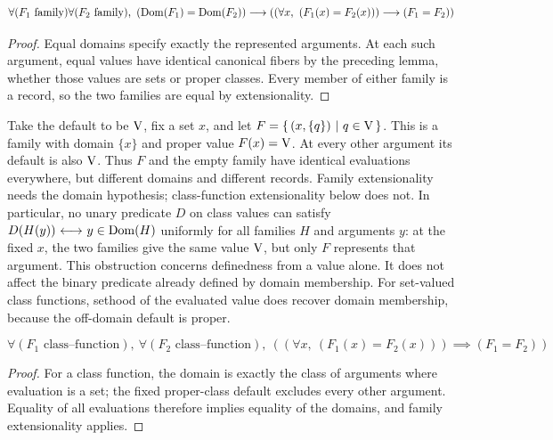 \begin{theorem}
\[
\forall (F_1 \text{ family})
\forall (F_2 \text{ family}),\ %
(\Dom(F_1)=\Dom(F_2))
\implies
(
(
\forall x,\ %
(F_1(x)=F_2(x))
)
\implies
(F_1 = F_2)
)
\]

\end{theorem}
\begin{proof}
Equal domains specify exactly the represented arguments. At each such
argument, equal values have identical canonical fibers by the preceding
lemma, whether those values are sets or proper classes. Every member of
either family is a record, so the two families are equal by extensionality.
\end{proof}
\begin{example}
Take the default to be $\mathrm{V}$, fix a set $x$, and let
$F=\left\{\,(x,\{q\})\ \middle|\ q\in\mathrm{V}\,\right\}$. This is a family with domain $\{x\}$
and proper value $F(x)=\mathrm{V}$. At every other argument its default is also
$\mathrm{V}$. Thus $F$ and the empty family have identical evaluations everywhere,
but different domains and different records. Family extensionality needs
the domain hypothesis; class-function extensionality below does not.
In particular, no unary predicate $D$ on class values can satisfy
$D(H(y)){\ \longleftrightarrow\ } y\in\mathrm{Dom}(H)$ uniformly for all families $H$ and
arguments $y$: at the fixed $x$, the two families give the same value
$\mathrm{V}$, but only $F$ represents that argument. This obstruction concerns
definedness from a value alone. It does not affect the binary predicate
already defined by domain membership. For set-valued class functions,
sethood of the evaluated value does recover domain membership, because
the off-domain default is proper.
\end{example}
\begin{theorem}
\[
\forall (F_1 \text{ class--function}),\ %
\forall (F_2 \text{ class--function}),\ %
(
(
\forall x,\ %
(F_1(x)=F_2(x))
)
\implies
(F_1 = F_2)
)
\]
\end{theorem}
\begin{proof}
For a class function, the domain is exactly the class of arguments where
evaluation is a set; the fixed proper-class default excludes every other
argument. Equality of all evaluations therefore implies equality of the
domains, and family extensionality applies.
\end{proof}
